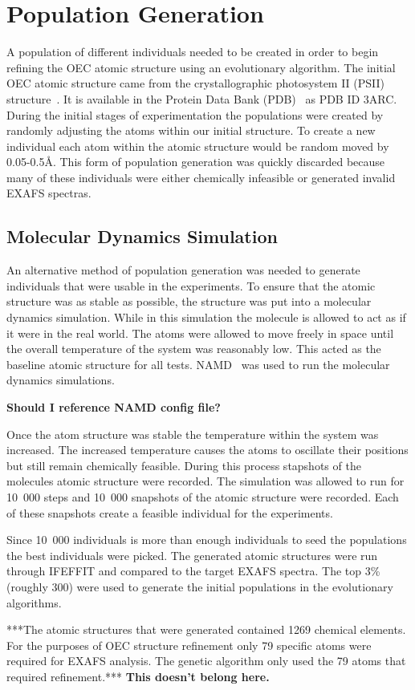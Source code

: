 \section{Population Generation}

A population of different individuals needed to be created in order to begin refining the OEC atomic structure using an evolutionary algorithm. The initial OEC atomic structure came from the crystallographic photosystem II (PSII) structure~\cite{umena2011crystal}. It is available in the Protein Data Bank (PDB)~\cite{databank} as PDB ID 3ARC. During the initial stages of experimentation the populations were created by randomly adjusting the atoms within our initial structure. To create a new individual each atom within the atomic structure would be random moved by 0.05-0.5\AA. This form of population generation was quickly discarded because many of these individuals were either chemically infeasible or generated invalid EXAFS spectras. 

\subsection{Molecular Dynamics Simulation}

An alternative method of population generation was needed to generate individuals that were usable in the experiments. To ensure that the atomic structure was as stable as possible, the structure was put into a molecular dynamics simulation. While in this simulation the molecule is allowed to act as if it were in the real world. The atoms were allowed to move freely in space until the overall temperature of the system was reasonably low. This acted as the baseline atomic structure for all tests. NAMD~\cite{namd} was used to run the molecular dynamics simulations.

\textbf{Should I reference NAMD config file?}

Once the atom structure was stable the temperature within the system was increased. The increased temperature causes the atoms to oscillate their positions but still remain chemically feasible. During this process stapshots of the molecules atomic structure were recorded. The simulation was allowed to run for 10\ 000 steps and 10\ 000 snapshots of the atomic structure were recorded. Each of these snapshots create a feasible individual for the experiments.

Since 10\ 000 individuals is more than enough individuals to seed the populations the best individuals were picked. The generated atomic structures were run through IFEFFIT and compared to the target EXAFS spectra. The top 3\% (roughly 300) were used to generate the initial populations in the evolutionary algorithms.

***The atomic structures that were generated contained 1269 chemical elements. For the purposes of OEC structure refinement only 79 specific atoms were required for EXAFS analysis. The genetic algorithm only used the 79 atoms that required refinement.*** \textbf{This doesn't belong here.}